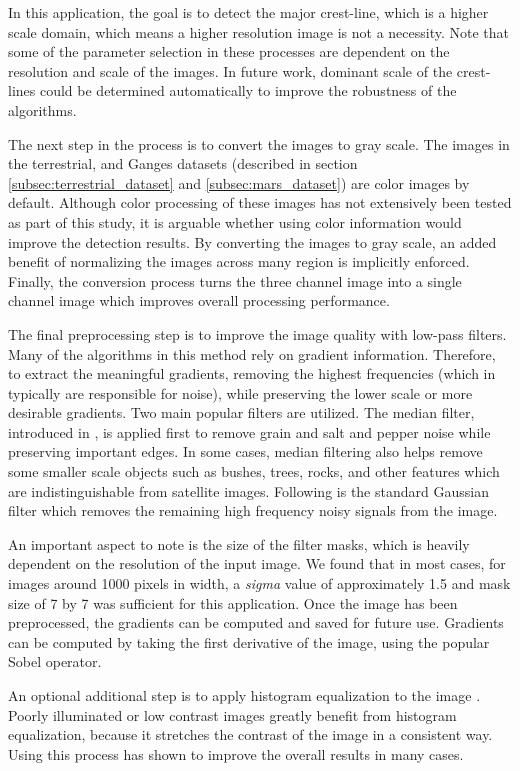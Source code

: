 In this application, the goal is to detect the major crest-line, which is a higher scale domain, which means a higher resolution image is not a necessity. Note that some of the parameter selection in these processes are dependent on the resolution and scale of the images. In future work, dominant scale of the crest-lines could be determined automatically to improve the robustness of the algorithms.

The next step in the process is to convert the images to gray scale. The images in the terrestrial, and Ganges datasets (described in section \ref{subsec:terrestrial_dataset} and \ref{subsec:mars_dataset}) are color images by default. Although color processing of these images has not extensively been tested as part of this study, it is arguable whether using color information would improve the detection results. By converting the images to gray scale, an added benefit of normalizing the images across many region is implicitly enforced. Finally, the conversion process turns the three channel image into a single channel image which improves overall processing performance.

The final preprocessing step is to improve the image quality with low-pass filters. Many of the algorithms in this method rely on gradient information. Therefore, to extract the meaningful gradients, removing the highest frequencies (which in typically are responsible for noise), while preserving the lower scale or more desirable gradients. Two main popular filters are utilized. The median filter, introduced in \cite{huang_median_filtering_algorithm}, is applied first to remove grain and salt and pepper noise while preserving important edges. In some cases, median filtering also helps remove some smaller scale objects such as bushes, trees, rocks, and other features which are indistinguishable from satellite images. Following is the standard Gaussian filter which removes the remaining high frequency noisy signals from the image.

An important aspect to note is the size of the filter masks, which is heavily dependent on the resolution of the input image. We found that in most cases, for images around 1000 pixels in width, a \emph{sigma} value of approximately 1.5 and mask size of 7 by 7 was sufficient for this application. Once the image has been preprocessed, the gradients can be computed and saved for future use. Gradients can be computed by taking the first derivative of the image, using the popular Sobel operator.

An optional additional step is to apply histogram equalization to the image \cite{digital_image_processing_book}. Poorly illuminated or low contrast images greatly benefit from histogram equalization, because it stretches the contrast of the image in a consistent way. Using this process has shown to improve the overall results in many cases. 

